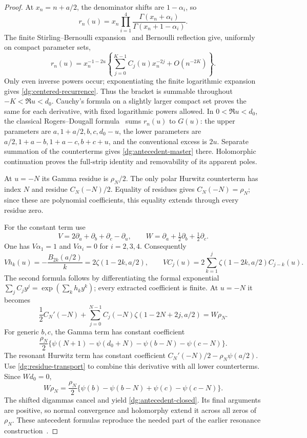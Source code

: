 \begin{proof}
At $x_n=n+a/2$, the denominator shifts are $1-\alpha_i$, so
\[
 r_n(u)=x_n\prod_{i=1}^4
                   \frac{\Gamma(x_n+\alpha_i)}{\Gamma(x_n+1-\alpha_i)}.
\]
The finite Stirling--Bernoulli expansion~\cite{DLMFGammaAsymptotic} and Bernoulli reflection
give, uniformly on compact parameter sets,
\[
 r_n(u)=x_n^{-1-2u}\left\{\sum_{j=0}^{K-1}C_j(u)x_n^{-2j}
                                     +O(n^{-2K})\right\}.
\]
Only even inverse powers occur; exponentiating the finite logarithmic
expansion gives \eqref{dg:centered-recurrence}. Thus the bracket is
summable throughout $-K<\Re u<d_0$. Cauchy's formula on a slightly
larger compact set proves the same for each derivative, with fixed
logarithmic powers allowed. In $0<\Re u<d_0$, the classical
Rogers--Dougall formula~\cite{DLMFDougall} sums $r_n(u)$ to $G(u)$:
the upper parameters are $a,1+a/2,b,c,d_0-u$, the lower parameters
are $a/2,1+a-b,1+a-c,b+c+u$, and the conventional excess is $2u$.
Separate summation of the counterterms gives
\eqref{dg:antecedent-master} there. Holomorphic continuation proves
the full-strip identity and removability of its apparent poles.

At $u=-N$ its Gamma residue is $\rho_N/2$. The only polar Hurwitz
counterterm has index $N$ and residue $C_N(-N)/2$. Equality of
residues gives $C_N(-N)=\rho_N$; since these are polynomial
coefficients, this equality extends through every residue zero.

For the constant term use
\[
 V=2\partial_a+\partial_b+\partial_c-\partial_u,
 \qquad W=\partial_a+\tfrac12\partial_b+\tfrac12\partial_c.
\]
One has $V\alpha_1=1$ and $V\alpha_i=0$ for $i=2,3,4$.
Consequently
\[
 Vh_k(u)=-\frac{B_{2k}(a/2)}k=2\zeta(1-2k,a/2),
 \qquad VC_j(u)=2\sum_{k=1}^j\zeta(1-2k,a/2)C_{j-k}(u).
\]
The second formula follows by differentiating the formal exponential
$\sum_jC_jy^j=\exp(\sum_kh_ky^k)$; every extracted coefficient is
finite. At $u=-N$ it becomes
\begin{equation}
 \frac12C_N'(-N)+\sum_{j=0}^{N-1}
 C_j(-N)\zeta(1-2N+2j,a/2)=W\rho_N.
 \label{dg:residue-transport}
\end{equation}
For generic $b,c$, the Gamma term has constant coefficient
\[
 \frac{\rho_N}{2}
 \{\psi(N+1)-\psi(d_0+N)-\psi(b-N)-\psi(c-N)\}.
\]
The resonant Hurwitz term has constant coefficient
$C_N'(-N)/2-\rho_N\psi(a/2)$. Use
\eqref{dg:residue-transport} to combine this derivative with all
lower counterterms. Since $Wd_0=0$,
\[
 W\rho_N=\frac{\rho_N}{2}
 \{\psi(b)-\psi(b-N)+\psi(c)-\psi(c-N)\}.
\]
The shifted digammas cancel and yield
\eqref{dg:antecedent-closed}. Its final arguments are positive, so
normal convergence and holomorphy extend it across all zeros of
$\rho_N$. These antecedent formulas reproduce the needed part of
the earlier resonance construction~\cite{RepoDougall,RepoTransport}.
\end{proof}

